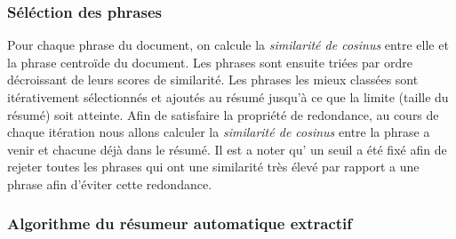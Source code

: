 

\subsubsection{Séléction des phrases}
Pour chaque phrase du document, on calcule la \emph{similarité de cosinus} entre elle et la phrase centroïde du document. Les phrases sont ensuite triées par ordre décroissant de leurs scores de similarité. Les phrases les mieux classées sont itérativement sélectionnés et ajoutés au résumé jusqu'à ce que la limite (taille du résumé) soit atteinte. Afin de satisfaire la propriété de redondance, au cours de chaque itération nous allons calculer la \emph{similarité de cosinus} entre la phrase a venir et chacune déjà dans le résumé.
Il est a noter qu' un seuil a été fixé afin de rejeter toutes les phrases qui ont une similarité très élevé par rapport a une phrase afin d'éviter cette redondance.


\subsubsection{Algorithme du résumeur automatique extractif}

